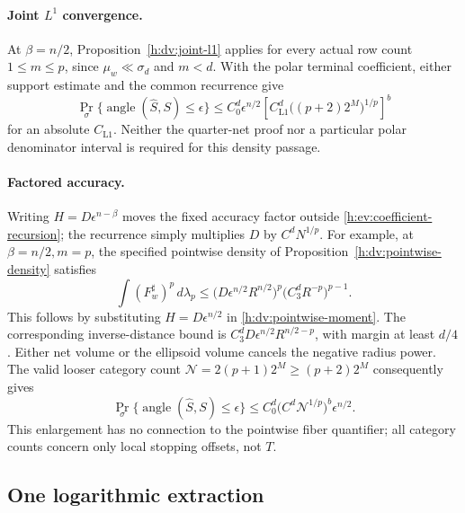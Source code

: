 \paragraph{Joint \(L^1\) convergence.}\label{h:dv:half-sphere-application}
At \(\beta=n/2\), Proposition~\ref{h:dv:joint-l1} applies for every
actual row count \(1\le m\le p\), since \(\mu_w\ll\sigma_d\) and
\(m<d\). With the polar terminal coefficient, either support estimate
and the common recurrence give
\begin{equation}\label{h:dv:l1-success}
 \Pr_\sigma\{\operatorname{angle}(\widehat S,S)\le\epsilon\}
 \le C_0^d\epsilon^{n/2}
 \left[C_{\mathrm{L1}}^d\bigl((p+2)2^M\bigr)^{1/p}\right]^b
\end{equation}
for an absolute \(C_{\mathrm{L1}}\). Neither the quarter-net proof
nor a particular polar denominator interval is required for this
density passage.

\paragraph{Factored accuracy.}\label{h:dv:factored-application}
Writing \(H=D\epsilon^{n-\beta}\) moves the fixed accuracy factor
outside \eqref{h:ev:coefficient-recursion}; the recurrence simply
multiplies \(D\) by \(C^dN^{1/p}\).
For example, at \(\beta=n/2,m=p\), the specified pointwise density
of Proposition~\ref{h:dv:pointwise-density} satisfies
\begin{equation}\label{h:dv:factored-moment}
 \int(F_w^\sharp)^p\,d\lambda_p
 \le
 \bigl(D\epsilon^{n/2}R^{n/2}\bigr)^p
 \bigl(C_3^dR^{-p}\bigr)^{p-1}.
\end{equation}
This follows by substituting \(H=D\epsilon^{n/2}\) in
\eqref{h:dv:pointwise-moment}. The corresponding inverse-distance
bound is \(C_3^dD\epsilon^{n/2}R^{n/2-p}\), with margin at least
\(d/4\). Either net volume or the ellipsoid volume cancels the
negative radius power. The valid looser category count
\(\mathcal N=2(p+1)2^M\ge(p+2)2^M\) consequently gives
\[
 \Pr_\sigma\{\operatorname{angle}(\widehat S,S)\le\epsilon\}
 \le C_0^d\bigl(C^d\mathcal N^{1/p}\bigr)^b\epsilon^{n/2}.
\]
This enlargement has no connection to the pointwise fiber quantifier;
all category counts concern only local stopping offsets, not \(T\).

\subsection{One logarithmic extraction}

